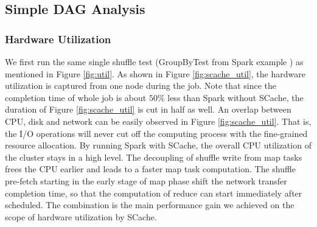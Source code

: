 \subsection{Simple DAG Analysis}
\subsubsection{Hardware Utilization}
We first run the same single shuffle test (GroupByTest from Spark example \cite{sparksource}) as mentioned in Figure \ref{fig:util}. As shown in Figure \ref{fig:scache_util}, the hardware utilization is captured from one node during the job. Note that since the completion time of whole job is about $50\%$ less than Spark without SCache, the duration of Figure \ref{fig:scache_util} is cut in half as well. An overlap between CPU, disk and network can be easily observed in Figure \ref{fig:scache_util}. That is, the I/O operations will never cut off the computing process with the fine-grained resource allocation. By running Spark with SCache, the overall CPU utilization of the cluster stays in a high level. The decoupling of shuffle write from map tasks frees the CPU earlier and leads to a faster map task computation. The shuffle pre-fetch starting in the early stage of map phase shift the network transfer completion time, so that the computation of reduce can start immediately after scheduled. The combination is the main performance gain we achieved on the scope of hardware utilization by SCache.

